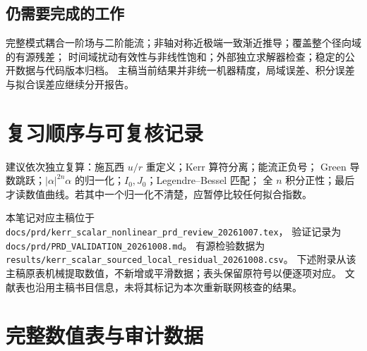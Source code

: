 \documentclass[UTF8,fontset=fandol,11pt,a4paper]{ctexart}
\numberwithin{equation}{section}
\begin{document}
\subsection{仍需要完成的工作}
完整模式耦合一阶场与二阶能流；非轴对称近极端一致渐近推导；覆盖整个径向域的有源残差；
时间域扰动有效性与非线性饱和；外部独立求解器检查；稳定的公开数据与代码版本归档。
主稿当前结果并非统一机器精度，局域误差、积分误差与拟合误差应继续分开报告。

\section{复习顺序与可复核记录}
建议依次独立复算：施瓦西 $u/r$ 重定义；Kerr 算符分离；能流正负号；
Green 导数跳跃；$|\alpha|^{2n}\alpha$ 的归一化；$I_0,J_0$；Legendre--Bessel 匹配；
全 $n$ 积分正性；最后才读数值曲线。若其中一个归一化不清楚，应暂停比较任何拟合指数。

本笔记对应主稿位于 \nolinkurl{docs/prd/kerr_scalar_nonlinear_prd_review_20261007.tex}，
验证记录为 \nolinkurl{docs/prd/PRD_VALIDATION_20261008.md}。
有源检验数据为 \nolinkurl{results/kerr_scalar_sourced_local_residual_20261008.csv}。
下述附录从该主稿原表机械提取数值，不新增或平滑数据；表头保留原符号以便逐项对应。
文献表也沿用主稿书目信息，未将其标记为本次重新联网核查的结果。
\clearpage\appendix
\section{完整数值表与审计数据}

\clearpage

\end{document}
